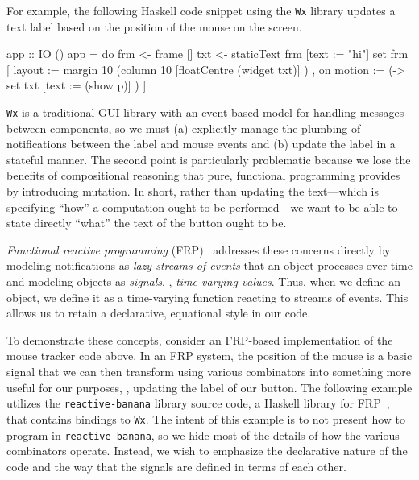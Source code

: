 For example, the following Haskell code snippet using the \texttt{Wx} library updates a text label  based on the position of the mouse on the screen.
\begin{haskellcode}
app :: IO ()
app = do
  frm <- frame []
  txt <- staticText frm [text := "hi"]
  set frm
    [ layout := margin 10 (column 10 [floatCentre (widget txt)] )
    , on motion := (\p -> set txt [text := (show p)] ) ]
\end{haskellcode}
\texttt{Wx} is a traditional GUI library with an event-based model for handling messages between components, so we must (a) explicitly manage the plumbing of notifications between the label and mouse events and (b) update the label in a stateful manner.
The second point is particularly problematic because we lose the benefits of compositional reasoning that pure, functional programming provides by introducing mutation.
In short, rather than updating the text---which is specifying ``how'' a computation ought to be performed---we want to be able to state directly ``what'' the text of the button ought to be.

\emph{Functional reactive programming} (FRP)~\cite{elliott1997, czaplicki2013, finkbeiner2019, jeffrey2012} addresses these concerns directly by modeling notifications as \emph{lazy streams of events} that an object processes over time and modeling objects as \emph{signals}, \ie, \emph{time-varying values}.
Thus, when we define an object, we define it as a time-varying function reacting to streams of events.
This allows us to retain a declarative, equational style in our code.

To demonstrate these concepts, consider an FRP-based implementation of the mouse tracker code above.
In an FRP system, the position of the mouse is a basic signal that we can then transform using various combinators into something more useful for our purposes, \eg, updating the label of our button.
The following example utilizes the \texttt{reactive-banana} library source code, a Haskell library for FRP~\cite{reactive-banana}, that contains bindings to \texttt{Wx}.
The intent of this example is to not present how to program in \texttt{reactive-banana}, so we hide most of the details of how the various combinators operate.
Instead, we wish to emphasize the declarative nature of the code and the way that the signals are defined in terms of each other.

